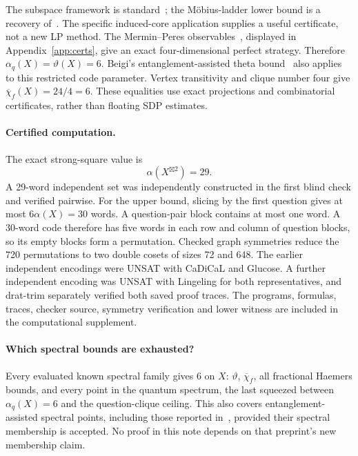 \begin{remark}
The subspace framework is standard~\cite[Section~2.1]{BC}; the
M\"obius-ladder lower bound is a recovery of~\cite{BKL}. The specific
induced-core application supplies a useful certificate, not a new LP
method. The Mermin--Peres observables~\cite{Mermin,Peres}, displayed in
Appendix~\ref{app:certs}, give an exact four-dimensional perfect
strategy. Therefore $\alpha_q(X)=\vartheta(X)=6$. Beigi's
entanglement-assisted theta bound~\cite{Beigi} also applies to this
restricted code parameter. Vertex transitivity
and clique number four give $\overline\chi_f(X)=24/4=6$.
These equalities use exact projections and combinatorial certificates,
rather than floating SDP estimates.
\end{remark}

\paragraph{Certified computation.}
The exact strong-square value is
\begin{equation}\label{eq:29}
 \alpha(X^{\boxtimes2})=29.
\end{equation}
A 29-word independent set was independently constructed in the first
blind check and verified pairwise. For the upper bound, slicing by
the first question gives at most $6\alpha(X)=30$ words. A question-pair
block contains at most one word. A 30-word code therefore has five
words in each row and column of question blocks, so its empty blocks
form a permutation. Checked graph symmetries reduce the 720 permutations
to two double cosets of sizes 72 and 648.
The earlier independent encodings were UNSAT with CaDiCaL and Glucose.
A further independent encoding was UNSAT with Lingeling for both
representatives, and drat-trim separately verified both saved proof
traces. The programs, formulas, traces, checker source, symmetry
verification and lower witness are included in the computational supplement.

\paragraph{Which spectral bounds are exhausted?}
Every evaluated known spectral family gives $6$ on $X$: $\vartheta$,
$\overline\chi_f$, all fractional Haemers bounds, and every point in
the quantum spectrum, the last squeezed between $\alpha_q(X)=6$ and
the question-clique ceiling. This also covers entanglement-assisted
spectral points, including those reported in~\cite{MD}, provided their
spectral membership is accepted. No proof in this note depends on that
preprint's new membership claim.


